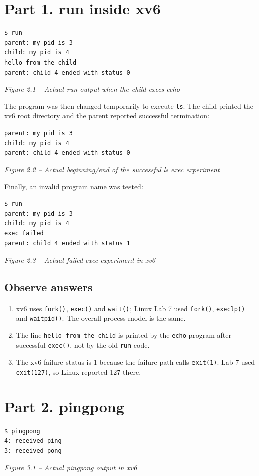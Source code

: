 \documentclass[12pt,a4paper]{article}
\newcommand{\figcap}[1]{\begin{center}\small\textit{#1}\end{center}\vspace{0.4em}}
\begin{document}
\section{Part 1. run inside xv6}
\begin{lstlisting}
$ run
parent: my pid is 3
child: my pid is 4
hello from the child
parent: child 4 ended with status 0
\end{lstlisting}
\figcap{Figure 2.1 -- Actual run output when the child execs echo}

The program was then changed temporarily to execute \texttt{ls}. The child printed the xv6 root directory and the parent reported successful termination:
\begin{lstlisting}
parent: my pid is 3
child: my pid is 4
parent: child 4 ended with status 0
\end{lstlisting}
\figcap{Figure 2.2 -- Actual beginning/end of the successful ls exec experiment}

Finally, an invalid program name was tested:
\begin{lstlisting}
$ run
parent: my pid is 3
child: my pid is 4
exec failed
parent: child 4 ended with status 1
\end{lstlisting}
\figcap{Figure 2.3 -- Actual failed exec experiment in xv6}

\subsection{Observe answers}
\begin{enumerate}[label=\arabic*.]
\item xv6 uses \texttt{fork()}, \texttt{exec()} and \texttt{wait()}; Linux Lab 7 used \texttt{fork()}, \texttt{execlp()} and \texttt{waitpid()}. The overall process model is the same.
\item The line \texttt{hello from the child} is printed by the \texttt{echo} program after successful \texttt{exec()}, not by the old \texttt{run} code.
\item The xv6 failure status is 1 because the failure path calls \texttt{exit(1)}. Lab 7 used \texttt{exit(127)}, so Linux reported 127 there.
\end{enumerate}

\section{Part 2. pingpong}
\begin{lstlisting}
$ pingpong
4: received ping
3: received pong
\end{lstlisting}
\figcap{Figure 3.1 -- Actual pingpong output in xv6}
\end{document}
